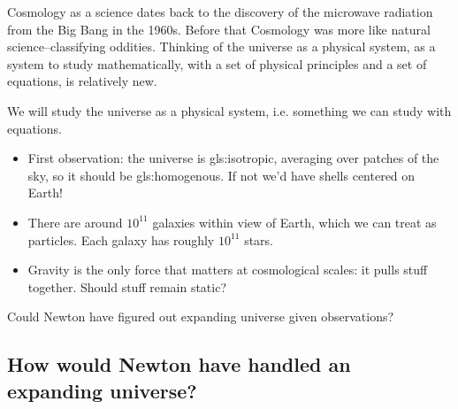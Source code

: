 \documentclass[]{article}
\begin{document}
Cosmology as a science dates back to the discovery of the microwave radiation from the Big Bang in the 1960s. Before that Cosmology was more like natural science--classifying oddities. Thinking of the universe as a physical system, as a system to study mathematically, with a set of physical principles and a set of equations, is relatively new.

We will study the universe as a physical system, i.e. something we can study with equations.

\begin{itemize}
	\item First observation: the universe is \gls{gls:isotropic}, averaging over patches of the sky, so it should be \gls{gls:homogenous}. If not we'd have shells centered on Earth!

	\item There are around $10^{11}$ galaxies within view of Earth, which we can treat as particles. Each galaxy has roughly $10^{11}$ stars.
	
	\item Gravity is the only force that matters at cosmological scales: it pulls stuff together. Should stuff remain static?
\end{itemize}

Could Newton have figured out expanding universe given observations?

\subsection{How would Newton have handled an expanding universe?}
\end{document}
